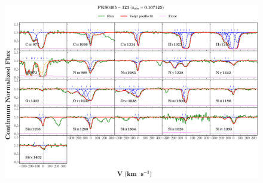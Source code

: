 \documentclass[12pt,draft]{report}
\begin{document}
\begin{landscape}

\begin{figure}
    \centering
    \vspace{-20mm}
    \hspace*{-35mm}
    \includegraphics[width=1.25\linewidth]{System-Plots/PKS0405-123_z=0.167125_sys_plot.png}
\end{figure}

\end{landscape}
\end{document}
